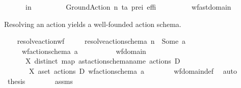 \begin{isabellebody}
\ \ \ \ \ \ in\ \isanewline
\ \ \ \ \ \ \ \ Ground{\isacharunderscore}{\kern0pt}Action\ n\ ta\ pre\isactrlsub i\ eff\isactrlsub i\isanewline
\ \ \ \ \ \ {\isacharparenright}{\kern0pt}{\isachardoublequoteclose}\isanewline
\isanewline
{}\isamarkupfalse%
\ %
\isanewline
\isanewline
{}\isamarkupfalse%
\ wf{\isacharunderscore}{\kern0pt}ast{\isacharunderscore}{\kern0pt}domain\ %
\begin{isamarkuptext}%
Resolving an action yields a well-founded action schema.%
\end{isamarkuptext}\isamarkuptrue%
\ \ \isamarkupfalse%
\ resolve{\isacharunderscore}{\kern0pt}action{\isacharunderscore}{\kern0pt}wf{\isacharcolon}{\kern0pt}\isanewline
\ \ \ \ \ {\isachardoublequoteopen}resolve{\isacharunderscore}{\kern0pt}action{\isacharunderscore}{\kern0pt}schema\ n\ {\isacharequal}{\kern0pt}\ Some\ a{\isachardoublequoteclose}\isanewline
\ \ \ \ \ {\isachardoublequoteopen}wf{\isacharunderscore}{\kern0pt}action{\isacharunderscore}{\kern0pt}schema\ a{\isachardoublequoteclose}\isanewline
%
\isadelimproof
\ \ %
\endisadelimproof
%
\isatagproof
{}\isamarkupfalse%
\ {\isacharminus}{\kern0pt}\isanewline
\ \ \ \ \isamarkupfalse%
\ wf{\isacharunderscore}{\kern0pt}domain\ \isamarkupfalse%
\isanewline
\ \ \ \ \ \ X{}{\isacharcolon}{\kern0pt}\ {\isachardoublequoteopen}distinct\ {\isacharparenleft}{\kern0pt}map\ ast{\isacharunderscore}{\kern0pt}action{\isacharunderscore}{\kern0pt}schema{\isachardot}{\kern0pt}name\ {\isacharparenleft}{\kern0pt}actions\ D{\isacharparenright}{\kern0pt}{\isacharparenright}{\kern0pt}{\isachardoublequoteclose}\isanewline
\ \ \ \ \ \ \ X{}{\isacharcolon}{\kern0pt}\ {\isachardoublequoteopen}{\isasymforall}a{\isasymin}set\ {\isacharparenleft}{\kern0pt}actions\ D{\isacharparenright}{\kern0pt}{\isachardot}{\kern0pt}\ wf{\isacharunderscore}{\kern0pt}action{\isacharunderscore}{\kern0pt}schema\ a{\isachardoublequoteclose}\isanewline
\ \ \ \ \ \ \isamarkupfalse%
\ wf{\isacharunderscore}{\kern0pt}domain{\isacharunderscore}{\kern0pt}def\ \isamarkupfalse%
\ auto\isanewline
\isanewline
\ \ \ \ \isamarkupfalse%
\ {\isacharquery}{\kern0pt}thesis\isanewline
\ \ \ \ \ \ \isamarkupfalse%
\ assms\ \isamarkupfalse%

\end{isabellebody}
